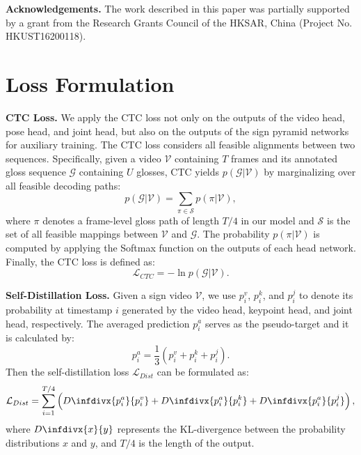 \documentclass{article}
\newcommand{\infdiv}{D\infdivx}
\begin{document}
\textbf{Acknowledgements.} The work described in this paper was partially supported by a grant from the Research Grants Council of the HKSAR, China (Project No. HKUST16200118).

 

\small



\appendix

\section{Loss Formulation}
\textbf{CTC Loss.} We apply the CTC loss \cite{graves2006connectionist} not only on the outputs of the video head, pose head, and joint head, but also on the outputs of the sign pyramid networks for auxiliary training. The CTC loss considers all feasible alignments between two sequences.
Specifically, given a video $\mathcal{V}$ containing $T$ frames and its annotated gloss sequence $\mathcal{G}$ containing $U$ glosses, CTC yields $p(\mathcal{G}|\mathcal{V})$ by marginalizing over all feasible decoding paths:
\begin{equation}
    p(\mathcal{G}|\mathcal{V}) = \sum_{\pi \in \mathcal{S}} p(\pi|\mathcal{V}),
\end{equation}
where $\pi$ denotes a frame-level gloss path of length $T/4$ in our model and $\mathcal{S}$ is the set of all feasible mappings between $\mathcal{V}$ and $\mathcal{G}$.
The probability $p(\pi|\mathcal{V})$ is computed by applying the Softmax function on the outputs of each head network. 
Finally, the CTC loss is defined as:
\begin{equation}
    \mathcal{L}_{CTC} = -\ln p(\mathcal{G}|\mathcal{V}).
\end{equation}

\textbf{Self-Distillation Loss.} Given a sign video $\mathcal{V}$, we use $p_i^v$, $p_i^k$, and $p_i^j$ to denote its probability at timestamp $i$ generated by the video head, keypoint head, and joint head, respectively. The averaged prediction $p_i^a$ serves as the pseudo-target and it is calculated by:
\begin{equation}
    p_i^a = \frac{1}{3} \left(p_i^v+p_i^k+p_i^j\right).
\end{equation}
Then the self-distillation loss $\mathcal{L}_{Dist}$ can be formulated as:
\begin{equation}
   \mathcal{L}_{Dist} = \sum_{i=1}^{T/4}\left(\infdiv{p_i^a}{p_i^v}+\infdiv{p_i^a}{p_i^k}+\infdiv{p_i^a}{p_i^j}\right),
\end{equation}
where $\infdiv{x}{y}$ represents the KL-divergence between the probability distributions $x$ and $y$, and $T/4$ is the length of the output.
\end{document}
